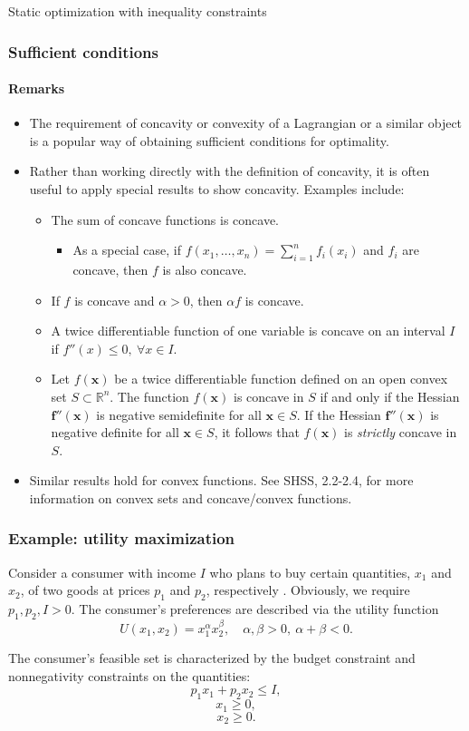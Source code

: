 \documentclass[10pt]{beamer}
\theoremstyle{definition}
\begin{document}
\begin{section}{Static optimization with inequality constraints}
\begin{frame}[fragile]
\frametitle{Sufficient conditions}
\framesubtitle{Remarks}
\begin{itemize}
\item The requirement of concavity or convexity of a Lagrangian or a similar object is a popular way of obtaining sufficient conditions for optimality.
\item Rather than working directly with the definition of concavity, it is often useful to apply special results to show concavity. Examples include:
\begin{itemize}
\item The sum of concave functions is concave.
\begin{itemize}
\item As a special case, if $ f(x_1,\ldots,x_n)=\sum_{i=1}^{n}f_i(x_i) $ and $ f_i $ are concave, then $ f $ is also concave.
\end{itemize}
\item If $ f $ is concave and $ \alpha>0 $, then $ \alpha f $ is concave.
\item A twice differentiable function of one variable is concave on an interval $ I $ if $ f''(x)\leq 0, ~\forall x \in I $.
\item Let $ f(\mathbf{x}) $ be a twice differentiable function defined on an open convex set $ S\subset \mathbb{R}^n $. The function $ f(\mathbf{x}) $ is concave in $ S $ if and only if the Hessian $ \mathbf{f''(x)} $ is negative semidefinite for all $ \mathbf{x}\in S $. If the Hessian $ \mathbf{f''(x)} $ is negative definite for all $ \mathbf{x}\in S $, it follows that $ f(\mathbf{x}) $ is \emph{strictly} concave in $ S $.
\end{itemize}
\item Similar results hold for convex functions. See SHSS, 2.2-2.4, for more information on convex sets and concave/convex functions.
\end{itemize}
\end{frame}

\begin{frame}[fragile]
\frametitle{Example: utility maximization}
Consider a consumer with income $ I $ who plans to buy certain quantities, $ x_1 $ and $ x_2 $, of two goods at prices $ p_1 $ and $ p_2 $, respectively . Obviously, we require $ p_1,p_2,I >0 $. The consumer's preferences are described via the utility function \[ U(x_1,x_2) = x_1^\alpha x_2^\beta,\quad \alpha,\beta >0,~\alpha+\beta < 0. \] 

The consumer's feasible set is characterized by the budget constraint and nonnegativity constraints on the quantities:   \[ p_1 x_1 + p_2 x_2 \leq I , \]  
\[ x_1\geq 0 , \] \[ x_2 \geq 0. \] 


\end{frame}
\end{section}
\end{document}
